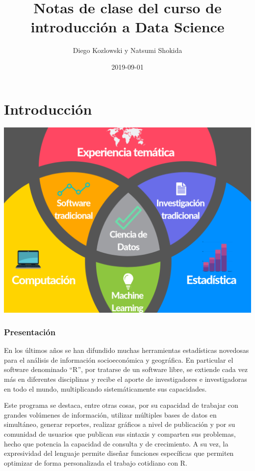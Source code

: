 \documentclass[]{book}
\title{Notas de clase del curso de introducción a Data Science}
\author{Diego Kozlowski y Natsumi Shokida}
\date{2019-09-01}
\begin{document}
\maketitle

{
\setcounter{tocdepth}{1}
\tableofcontents
}
\hypertarget{introduccion}{%
\chapter*{Introducción}\label{introduccion}}

\includegraphics[width=10.41667in,height=\textheight]{img/venn_ds.png}

\hypertarget{presentacion}{%
\subsection*{Presentación}\label{presentacion}}

En los últimos años se han difundido muchas herramientas estadísticas novedosas para el análisis de información socioeconómica y geográfica. En particular el software denominado ``R'', por tratarse de un software libre, se extiende cada vez más en diferentes disciplinas y recibe el aporte de investigadores e investigadoras en todo el mundo, multiplicando sistemáticamente sus capacidades.

Este programa se destaca, entre otras cosas, por su capacidad de trabajar con grandes volúmenes de información, utilizar múltiples bases de datos en simultáneo, generar reportes, realizar gráficos a nivel de publicación y por su comunidad de usuarios que publican sus sintaxis y comparten sus problemas, hecho que potencia la capacidad de consulta y de crecimiento. A su vez, la expresividad del lenguaje permite diseñar funciones específicas que permiten optimizar de forma personalizada el trabajo cotidiano con R.
\end{document}
